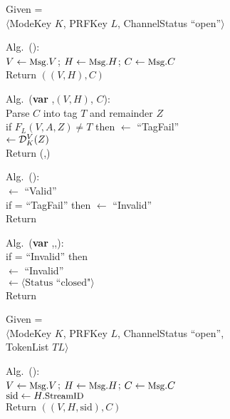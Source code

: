 \begin{figure}
\centering
{}
{
Given =\\[-0.5ex]
\nudge$\langle$ModeKey $K$, PRFKey $L$, ChannelStatus
``open''$\rangle$ 

\medskip
Alg.\ ():\\
\nudge $V \gets \textrm{\small Msg}.V$; $H \gets \textrm{\small Msg}.H$; $C \gets
\textrm{\small Msg}.C$\\
\nudge Return $\left((V, H),C\right)$

\medskip
Alg.\ ({\bf var} ,$(V,H)$, $C$):\\
\nudge Parse $C$ into tag $T$ and remainder $Z$\\ 
\nudge if $F_L(V,A,Z) \neq T$ then  $\gets$ ``TagFail''\\
\nudge{} $\gets \mathcal{D}_K^{V}(Z)$\\
\nudge Return (,)

\medskip
Alg.\ ():\\
\nudge {} $\gets$ ``Valid''\\
\nudge if  =  ``TagFail'' then  $\gets$ ``Invalid''\\
\nudge Return 

\medskip
Alg.\ ({\bf var} ,,):\\
\nudge if  = ``Invalid'' then \\
\nudge\nudge {} $\gets$ ``Invalid'' \\
\nudge\nudge {} $\gets \langle
\mbox{Status ``closed"} \rangle$\\
\nudge Return 
}
%
{
Given =\\[-0.5ex]
\nudge $\langle$ModeKey $K$, PRFKey $L$, ChannelStatus ``open'',\\
\nudge\nudge TokenList $ \mathit{TL}\rangle$

\medskip
Alg.\ ():\\
\nudge $V \gets \textrm{\small Msg}.V$; $H \gets \textrm{\small Msg}.H$; $C \gets \textrm{\small Msg}.C$\\
\nudge $\mathrm{sid} \gets H.\textrm{\small StreamID}$\\
\nudge Return $\left((V, H, \mathrm{sid}),C\right)$

}
\end{figure}
